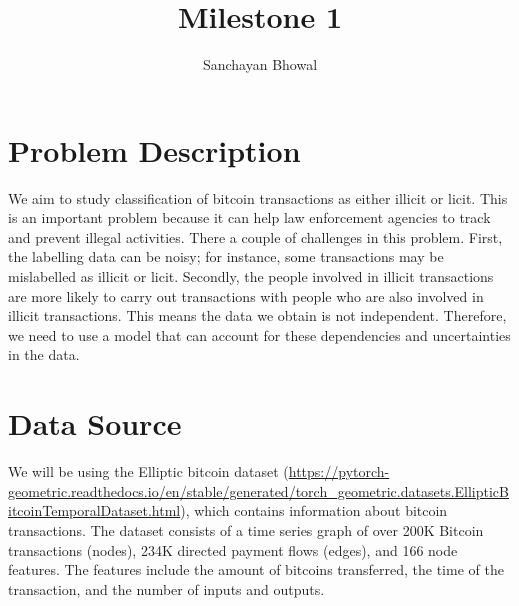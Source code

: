 \documentclass[12pt]{amsart}
\title{Milestone 1}
\author{Sanchayan Bhowal}
\begin{document}
\maketitle

\section{Problem Description}
We aim to study classification of bitcoin transactions as either illicit or licit. This is an important problem because it can help law enforcement agencies to track and prevent illegal activities. There a couple of challenges in this problem. First, the labelling data can be noisy; for instance, some transactions may be mislabelled as illicit or licit. Secondly, the people involved in illicit transactions are more likely to carry out transactions with people who are also involved in illicit transactions. This means the data we obtain is not independent. Therefore, we need to use a model that can account for these dependencies and uncertainties in the data.
\section{Data Source}
We will be using the Elliptic bitcoin dataset (\url{https://pytorch-geometric.readthedocs.io/en/stable/generated/torch_geometric.datasets.EllipticBitcoinTemporalDataset.html}), which contains information about bitcoin transactions. The dataset consists of a time series graph of over 200K Bitcoin transactions (nodes), 234K directed payment flows (edges), and 166 node features. The features include the amount of bitcoins transferred, the time of the transaction, and the number of inputs and outputs.
\end{document}

